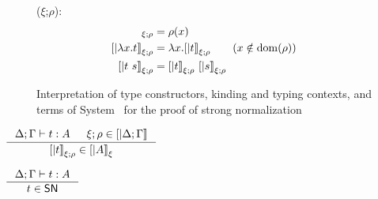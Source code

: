 \begin{figure}
\begin{singlespace}
\begin{description}
	($\xi$;$\rho$):
\begin{align*}
[| x      |]_{\xi;\rho} &= \rho(x) \\
[| \l x.t |]_{\xi;\rho} &= \l x . [|t|]_{\xi;\rho} \qquad (x\notin\dom(\rho)) \\
[| t ~ s  |]_{\xi;\rho} &= [| t |]_{\xi;\rho} ~ [| s |]_{\xi;\rho}
\end{align*}
\end{description}
\caption[Interpretation of System \Fw\ for proving strong normalization]
	{Interpretation of type constructors, kinding and typing contexts,
		and terms of System \Fw\ for the proof of strong normalization}
\label{fig:interpFw}
\end{singlespace}
\end{figure}


\begin{theorem}
$ \inference{\Delta;\Gamma|- t:A & \xi;\rho \in [|\Delta;\Gamma|]}
	    {[|t|]_{\xi;\rho} \in [|A|]_\xi} $
\end{theorem}

\begin{corollary}
	$\inference{\Delta;\Gamma |- t : A}{t \in \SN}$
\end{corollary}

